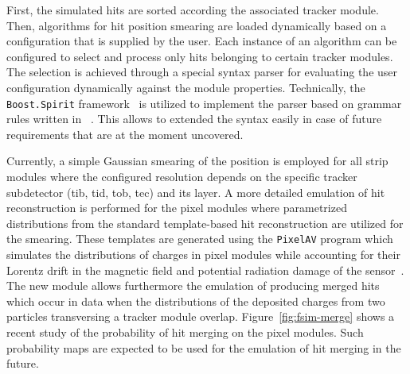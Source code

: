 First, the simulated hits are sorted according the associated tracker module. Then, algorithms for hit position smearing are loaded dynamically based on a configuration that is supplied by the user. Each instance of an algorithm can be configured to select and process only hits belonging to certain tracker modules. The selection is achieved through a special syntax parser for evaluating the user configuration dynamically against the module properties. Technically, the \texttt{Boost.Spirit} framework~\cite{boostspirit} is utilized to implement the parser based on grammar rules written in ~\cite{ebnf}. This allows to extended the syntax easily in case of future requirements that are at the moment uncovered.

Currently, a simple Gaussian smearing of the position is employed for all strip modules where the configured resolution depends on the specific tracker subdetector (\gls{tib}, \gls{tid}, \gls{tob}, \gls{tec}) and its layer. A more detailed emulation of hit reconstruction is performed for the pixel modules where parametrized distributions from the standard template-based hit reconstruction are utilized for the smearing. These templates are generated using the \texttt{PixelAV} program which simulates the distributions of charges in pixel modules while accounting for their Lorentz drift in the magnetic field and potential radiation damage of the sensor~\cite{Swartz:2002kda}. The new \FSIM module allows furthermore the emulation of producing merged hits which occur in data when the distributions of the deposited charges from two particles transversing a tracker module overlap. Figure~\ref{fig:fsim-merge} shows a recent study of the probability of hit merging on the pixel modules. Such probability maps are expected to be used for the emulation of hit merging in the future.






